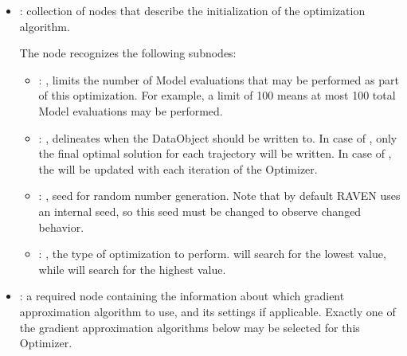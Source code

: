 \begin{itemize}
    \item {}:
      collection of nodes that describe the initialization of the optimization algorithm.

      The  node recognizes the following subnodes:
      \begin{itemize}
        \item {}: , 
          limits the number of Model evaluations that may be performed as part of this optimization.
          For example, a limit of 100 means at most 100 total Model evaluations may be performed.

        \item {}: , 
          delineates when the  DataObject should be written to. In case
          of , only the final optimal solution for each trajectory will be written.
          In case of , the  will be updated with each
          iteration               of the Optimizer.

        \item {}: , 
          seed for random number generation. Note that by default RAVEN uses an internal seed,
          so this seed must be changed to observe changed behavior. 

        \item {}: , 
          the type of optimization to perform.  will search for the lowest
           value, while  will search for the highest value.
      \end{itemize}

    \item {}:
      a required node containing the information about which gradient approximation algorithm to
      use, and its settings if applicable. Exactly one of the gradient approximation algorithms
      below may be selected for this Optimizer.


\end{itemize}
